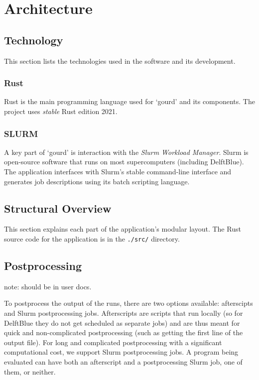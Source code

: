 \pagebreak


\section{Architecture}\label{sec:architecture}

\subsection{Technology}

This section lists the technologies used in the software and its development.

\subsubsection{Rust}

Rust is the main programming language used for `gourd' and its components.
The project uses \emph{stable} Rust edition 2021.

\subsubsection{SLURM}

A key part of `gourd' is interaction with the \emph{Slurm Workload Manager}.
Slurm is open-source software that runs on most supercomputers (including
DelftBlue). The application interfaces with Slurm's stable command-line
interface and generates job descriptions using its batch scripting language.


\subsection{Structural Overview}

This section explains each part of the application's modular layout.
The Rust source code for the application is in the \verb|./src/| directory.

\subsection{Postprocessing}
note: should be in user docs.

To postprocess the output of the runs, there are two options available: afterscipts and Slurm postprocessing jobs. 
Afterscripts are scripts that run locally (so for DelftBlue they do not get scheduled as separate jobs) and are 
thus meant for quick and non-complicated postprocessing (such as getting the first line of the output file). For 
long and complicated postprocessing with a significant computational cost, we support Slurm postprocessing jobs.
A program being evaluated can have both an afterscript and a postprocessing Slurm job, one of them, or neither.

